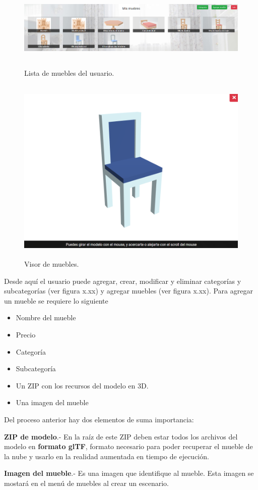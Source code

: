 \begin{figure}[hbt!]
	\centering
	\includegraphics[width=17cm,height=4cm]{imagenes/desarrollo/app/WEB_FURNITURES.png}
	\caption{Lista de muebles del usuario.}
	\label{fig:weblogin}
\end{figure}
\begin{figure}[hbt!]
	\centering
	\includegraphics[width=15cm,height=9cm]{imagenes/desarrollo/app/WEB_MODEL.png}
	\caption{Visor de muebles.}
	\label{fig:webviewer}
\end{figure}

Desde aquí el usuario puede agregar, crear, modificar y eliminar categorías y subcategorías (ver figura x.xx) y agregar muebles (ver figura x.xx). Para agregar un mueble se requiere lo siguiente
\begin{itemize}
	\item Nombre del mueble
	\item Precio
	\item Categoría
	\item Subcategoría
	\item Un ZIP con los recursos del modelo en 3D.
	\item Una imagen del  mueble
\end{itemize}
Del proceso anterior hay dos elementos de suma importancia:\par
\textbf{ZIP de modelo}.- En la raíz de este ZIP deben estar todos los archivos del modelo en \textbf{formato glTF}, formato necesario para poder recuperar el mueble de la nube y usarlo en la realidad aumentada en tiempo de ejecución. \par
\textbf{Imagen del mueble}.- Es una imagen que identifique al mueble. Esta imagen se mostará en el menú de muebles al crear un escenario.\par



